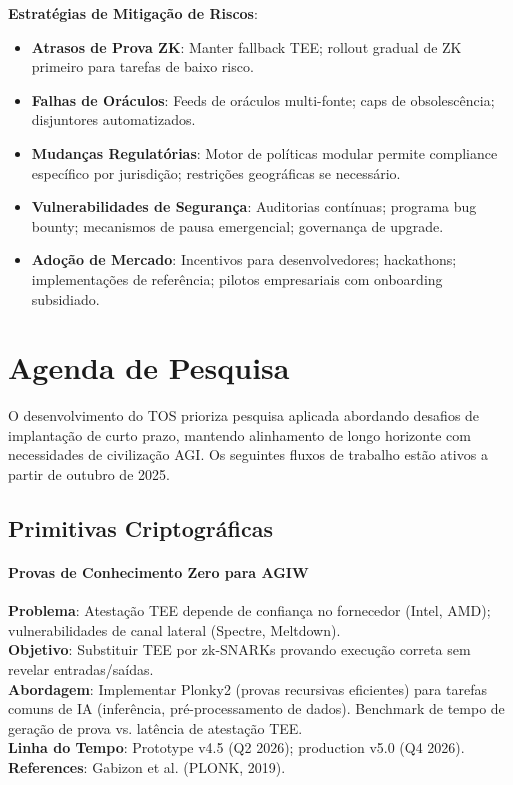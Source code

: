 \documentclass[11pt]{article}
\begin{document}
\begin{itemize}[noitemsep]
\begin{itemize}[noitemsep]
\begin{itemize}[noitemsep]
\textbf{Estratégias de Mitigação de Riscos}:
\begin{itemize}[noitemsep]
  \item \textbf{Atrasos de Prova ZK}: Manter fallback TEE; rollout gradual de ZK primeiro para tarefas de baixo risco.
  \item \textbf{Falhas de Oráculos}: Feeds de oráculos multi-fonte; caps de obsolescência; disjuntores automatizados.
  \item \textbf{Mudanças Regulatórias}: Motor de políticas modular permite compliance específico por jurisdição; restrições geográficas se necessário.
  \item \textbf{Vulnerabilidades de Segurança}: Auditorias contínuas; programa bug bounty; mecanismos de pausa emergencial; governança de upgrade.
  \item \textbf{Adoção de Mercado}: Incentivos para desenvolvedores; hackathons; implementações de referência; pilotos empresariais com onboarding subsidiado.
\end{itemize}

\section{Agenda de Pesquisa}
\label{sec:research}

O desenvolvimento do TOS prioriza pesquisa aplicada abordando desafios de implantação de curto prazo, mantendo alinhamento de longo horizonte com necessidades de civilização AGI. Os seguintes fluxos de trabalho estão ativos a partir de outubro de 2025.

\subsection{Primitivas Criptográficas}

\paragraph{Provas de Conhecimento Zero para AGIW}
\textbf{Problema}: Atestação TEE depende de confiança no fornecedor (Intel, AMD); vulnerabilidades de canal lateral (Spectre, Meltdown).\\
\textbf{Objetivo}: Substituir TEE por zk-SNARKs provando execução correta sem revelar entradas/saídas.\\
\textbf{Abordagem}: Implementar Plonky2 (provas recursivas eficientes) para tarefas comuns de IA (inferência, pré-processamento de dados). Benchmark de tempo de geração de prova vs. latência de atestação TEE.\\
\textbf{Linha do Tempo}: Prototype v4.5 (Q2 2026); production v5.0 (Q4 2026).\\
\textbf{References}: Gabizon et al. (PLONK, 2019).


\end{itemize}
\end{itemize}
\end{itemize}
\end{document}
